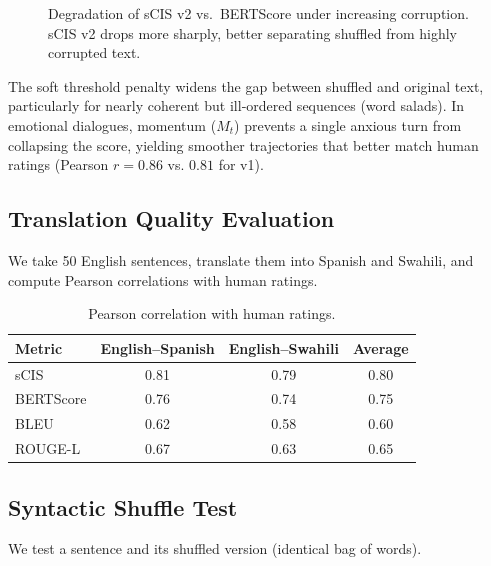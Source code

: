 \documentclass[11pt]{article}
\theoremstyle{definition}
\begin{document}
\begin{figure}[htbp]
\centering
{}
\caption{Degradation of sCIS v2 vs.\ BERTScore under increasing corruption. sCIS v2 drops more sharply, better separating shuffled from highly corrupted text.}
\label{fig:decay}
\end{figure}

The soft threshold penalty widens the gap between shuffled and original text, particularly for nearly coherent but ill‑ordered sequences (word salads). In emotional dialogues, momentum (\(M_t\)) prevents a single anxious turn from collapsing the score, yielding smoother trajectories that better match human ratings (Pearson \(r=0.86\) vs. \(0.81\) for v1).

\subsection{Translation Quality Evaluation}
We take 50 English sentences, translate them into Spanish and Swahili, and compute Pearson correlations with human ratings.

\begin{table}[htbp]
\centering
\caption{Pearson correlation with human ratings.}
\begin{tabular}{lccc}
\toprule
Metric & English–Spanish & English–Swahili & Average \\
\midrule
sCIS & 0.81 & 0.79 & 0.80 \\
BERTScore & 0.76 & 0.74 & 0.75 \\
BLEU & 0.62 & 0.58 & 0.60 \\
ROUGE-L & 0.67 & 0.63 & 0.65 \\
\bottomrule
\end{tabular}
\end{table}

\subsection{Syntactic Shuffle Test}
We test a sentence and its shuffled version (identical bag of words).
\end{document}
